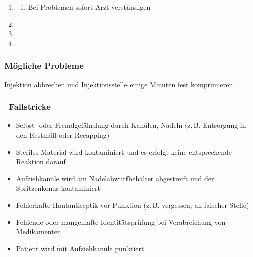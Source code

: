 \begin{FamPropHandlungsschritte}
\begin{enumerate}
  \begin{enumerate}
    \item Wundpflaster
  \end{enumerate}
  \item {}
  \begin{enumerate}
    \item Bei Problemen sofort Arzt verständigen
  \end{enumerate}
  \item {}
  \item {}
  \item {}
\end{enumerate}
\end{FamPropHandlungsschritte}





\subsubsection{Mögliche Probleme}


{Injektion abbrechen und
Injektionsstelle einige Minuten fest komprimieren.}
{}
{}
{}
{}







\subsubsection{\RoteKarte\ Fallstricke}
\begin{FamPropFallstricke}
\begin{itemize}
  \item[\RoteKarte] Selbst- oder Fremdgefährdung durch
  Kanülen, Nadeln (z.\,B. Entsorgung in den Restmüll oder Recapping)
  \item[\RoteKarte] Steriles Material wird kontaminiert und
  es erfolgt keine entsprechende Reaktion darauf
  \item[\RoteKarte] Aufziehkanüle wird am
  Nadelabwurfbehälter abgestreift und der Spritzenkonus kontaminiert
  \item[\RoteKarte] Fehlerhafte Hautantiseptik vor Punktion
  (z.\,B. vergessen, an falscher Stelle)
  \item[\RoteKarte] Fehlende oder mangelhafte
  Identitätsprüfung bei Verabreichung von Medikamenten
  \item[\RoteKarte] Patient wird mit Aufziehkanüle punktiert
\end{itemize}
\end{FamPropFallstricke}


